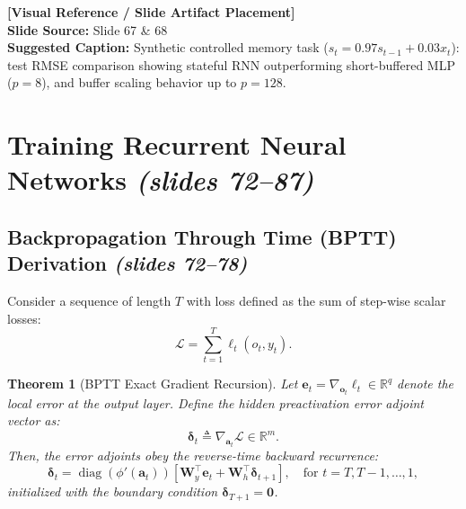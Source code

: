 \documentclass[11pt,a4paper]{article}
\theoremstyle{definition}
\theoremstyle{plain}
\newtheorem{theorem}{Theorem}[section]
\newcommand{\slideimageplaceholder}[2]{
    \begin{center}
    \begin{tcolorbox}[
        enhanced,
        colback=gray!8!white,
        colframe=gray!60!black,
        width=0.92\textwidth,
        arc=2mm,
        frame hidden,
        borderline={0.5mm}{0mm}{gray!60!black, dashed},
        halign=center
    ]
        \vspace{0.4cm}
        \textbf{\textsf{[Visual Reference / Slide Artifact Placement]}} \\
        \vspace{0.2cm}
        \textsf{\textbf{Slide Source:} Slide #1} \\
        \textsf{\textbf{Suggested Caption:} #2}
        \vspace{0.4cm}
    \end{tcolorbox}
    \end{center}
}
\begin{document}
\slideimageplaceholder{67 \& 68}{Synthetic controlled memory task ($s_t = 0.97s_{t-1} + 0.03x_t$): test RMSE comparison showing stateful RNN outperforming short-buffered MLP ($p=8$), and buffer scaling behavior up to $p=128$.}

\section{Training Recurrent Neural Networks \emph{(slides 72--87)}}

\subsection{Backpropagation Through Time (BPTT) Derivation \emph{(slides 72--78)}}
Consider a sequence of length $T$ with loss defined as the sum of step-wise scalar losses:
\begin{equation}
    \mathcal{L} = \sum_{t=1}^T \ell_t(o_t, y_t).
\end{equation}

\begin{theorem}[BPTT Exact Gradient Recursion]
Let $\mathbf{e}_t = \nabla_{\mathbf{o}_t} \ell_t \in \mathbb{R}^q$ denote the local error at the output layer. Define the hidden preactivation error adjoint vector as:
\begin{equation}
    \boldsymbol{\delta}_t \triangleq \nabla_{\mathbf{a}_t} \mathcal{L} \in \mathbb{R}^m.
\end{equation}
Then, the error adjoints obey the reverse-time backward recurrence:
\begin{equation}
    \boldsymbol{\delta}_t = \operatorname{diag}\left(\phi'(\mathbf{a}_t)\right) \left[ \mathbf{W}_y^\top \mathbf{e}_t + \mathbf{W}_h^\top \boldsymbol{\delta}_{t+1} \right], \quad \text{for } t = T, T-1, \dots, 1,
\end{equation}
initialized with the boundary condition $\boldsymbol{\delta}_{T+1} = \mathbf{0}$.
\end{theorem}
\end{document}
